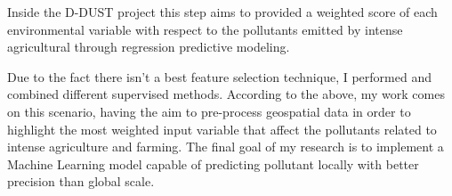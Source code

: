 \bigbreak
Inside the D-DUST project this step aims to provided a weighted score of each environmental variable with respect to the pollutants emitted by intense agricultural through regression predictive modeling.\newline
\par
Due to the fact there isn’t a best feature selection technique, I performed and combined different supervised methods. 
\bigbreak
According to the above, my work comes on this scenario, having the aim to pre-process geospatial data in order to highlight the most weighted input variable that affect the pollutants related to intense agriculture and farming.\newline
The final goal of my research is to implement a Machine Learning model capable of predicting pollutant locally with better precision than global scale. 




